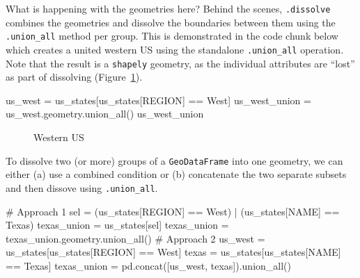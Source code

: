 \documentclass[
  letterpaper,
]{krantz}
\newenvironment{Shaded}{\begin{snugshade}}{\end{snugshade}}
\newcommand{\CommentTok}[1]{\textcolor[rgb]{0.37,0.37,0.37}{#1}}
\newcommand{\NormalTok}[1]{\textcolor[rgb]{0.00,0.23,0.31}{#1}}
\newcommand{\OperatorTok}[1]{\textcolor[rgb]{0.37,0.37,0.37}{#1}}
\newcommand{\StringTok}[1]{\textcolor[rgb]{0.13,0.47,0.30}{#1}}
\begin{document}
What is happening with the geometries here? Behind the scenes,
\texttt{.dissolve} combines the geometries and dissolve the boundaries
between them using the \texttt{.union\_all} method per group. This is
demonstrated in the code chunk below which creates a united western US
using the standalone \texttt{.union\_all} operation. Note that the
result is a \texttt{shapely} geometry, as the individual attributes are
``lost'' as part of dissolving (Figure~\ref{fig-dissolve2}).

\begin{Shaded}
\begin{Highlighting}[]
\NormalTok{us\_west }\OperatorTok{=}\NormalTok{ us\_states[us\_states[}\StringTok{\textquotesingle{}REGION\textquotesingle{}}\NormalTok{] }\OperatorTok{==} \StringTok{\textquotesingle{}West\textquotesingle{}}\NormalTok{]}
\NormalTok{us\_west\_union }\OperatorTok{=}\NormalTok{ us\_west.geometry.union\_all()}
\NormalTok{us\_west\_union}
\end{Highlighting}
\end{Shaded}

\begin{figure}[H]


\caption{\label{fig-dissolve2}Western US}

\end{figure}%

To dissolve two (or more) groups of a \texttt{GeoDataFrame} into one
geometry, we can either (a) use a combined condition or (b) concatenate
the two separate subsets and then dissove using \texttt{.union\_all}.

\begin{Shaded}
\begin{Highlighting}[]
\CommentTok{\# Approach 1}
\NormalTok{sel }\OperatorTok{=}\NormalTok{ (us\_states[}\StringTok{\textquotesingle{}REGION\textquotesingle{}}\NormalTok{] }\OperatorTok{==} \StringTok{\textquotesingle{}West\textquotesingle{}}\NormalTok{) }\OperatorTok{|}\NormalTok{ (us\_states[}\StringTok{\textquotesingle{}NAME\textquotesingle{}}\NormalTok{] }\OperatorTok{==} \StringTok{\textquotesingle{}Texas\textquotesingle{}}\NormalTok{)}
\NormalTok{texas\_union }\OperatorTok{=}\NormalTok{ us\_states[sel]}
\NormalTok{texas\_union }\OperatorTok{=}\NormalTok{ texas\_union.geometry.union\_all()}
\CommentTok{\# Approach 2}
\NormalTok{us\_west }\OperatorTok{=}\NormalTok{ us\_states[us\_states[}\StringTok{\textquotesingle{}REGION\textquotesingle{}}\NormalTok{] }\OperatorTok{==} \StringTok{\textquotesingle{}West\textquotesingle{}}\NormalTok{]}
\NormalTok{texas }\OperatorTok{=}\NormalTok{ us\_states[us\_states[}\StringTok{\textquotesingle{}NAME\textquotesingle{}}\NormalTok{] }\OperatorTok{==} \StringTok{\textquotesingle{}Texas\textquotesingle{}}\NormalTok{]}
\NormalTok{texas\_union }\OperatorTok{=}\NormalTok{ pd.concat([us\_west, texas]).union\_all()}
\end{Highlighting}
\end{Shaded}
\end{document}
